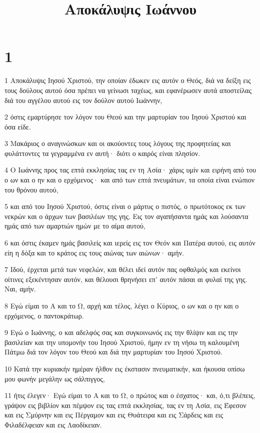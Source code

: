 

\title{Αποκάλυψις Ιωάννου}


\chapter{1}

\par 1 Αποκάλυψις Ιησού Χριστού, την οποίαν έδωκεν εις αυτόν ο Θεός, διά να δείξη εις τους δούλους αυτού όσα πρέπει να γείνωσι ταχέως, και εφανέρωσεν αυτά αποστείλας διά του αγγέλου αυτού εις τον δούλον αυτού Ιωάννην,
\par 2 όστις εμαρτύρησε τον λόγον του Θεού και την μαρτυρίαν του Ιησού Χριστού και όσα είδε.
\par 3 Μακάριος ο αναγινώσκων και οι ακούοντες τους λόγους της προφητείας και φυλάττοντες τα γεγραμμένα εν αυτή· διότι ο καιρός είναι πλησίον.
\par 4 Ο Ιωάννης προς τας επτά εκκλησίας τας εν τη Ασία· χάρις υμίν και ειρήνη από του ο ων και ο ην και ο ερχόμενος· και από των επτά πνευμάτων, τα οποία είναι ενώπιον του θρόνου αυτού,
\par 5 και από του Ιησού Χριστού, όστις είναι ο μάρτυς ο πιστός, ο πρωτότοκος εκ των νεκρών και ο άρχων των βασιλέων της γης. Εις τον αγαπήσαντα ημάς και λούσαντα ημάς από των αμαρτιών ημών με το αίμα αυτού,
\par 6 και όστις έκαμεν ημάς βασιλείς και ιερείς εις τον Θεόν και Πατέρα αυτού, εις αυτόν είη η δόξα και το κράτος εις τους αιώνας των αιώνων· αμήν.
\par 7 Ιδού, έρχεται μετά των νεφελών, και θέλει ιδεί αυτόν πας οφθαλμός και εκείνοι οίτινες εξεκέντησαν αυτόν, και θέλουσι θρηνήσει επ' αυτόν πάσαι αι φυλαί της γης. Ναι, αμήν.
\par 8 Εγώ είμαι το Α και το Ω, αρχή και τέλος, λέγει ο Κύριος, ο ων και ο ην και ο ερχόμενος, ο παντοκράτωρ.
\par 9 Εγώ ο Ιωάννης, ο και αδελφός σας και συγκοινωνός εις την θλίψιν και εις την βασιλείαν και την υπομονήν του Ιησού Χριστού, ήμην εν τη νήσω τη καλουμένη Πάτμω διά τον λόγον του Θεού και διά την μαρτυρίαν του Ιησού Χριστού.
\par 10 Κατά την κυριακήν ημέραν ήλθον εις έκστασιν πνευματικήν, και ήκουσα οπίσω μου φωνήν μεγάλην ως σάλπιγγος,
\par 11 ήτις έλεγεν· Εγώ είμαι το Α και το Ω, ο πρώτος και ο έσχατος· και, ό,τι βλέπεις, γράψον εις βιβλίον και πέμψον εις τας επτά εκκλησίας, τας εν τη Ασία, εις Έφεσον και εις Σμύρνην και εις Πέργαμον και εις Θυάτειρα και εις Σάρδεις και εις Φιλαδέλφειαν και εις Λαοδίκειαν.
